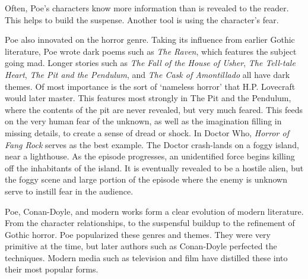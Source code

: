 \documentclass[12pt]{article}
\begin{document}
Often, Poe's characters know more information than is revealed to the reader.
This helps to build the suspense. Another tool is using the character's fear.

Poe also innovated on the horror genre. Taking its influence from earlier
Gothic literature, Poe wrote dark poems such as \emph{The Raven}, which
features the subject going mad. Longer stories such as \emph{The Fall of the
House of Usher}, \emph{The Tell-tale Heart}, \emph{The Pit and the Pendulum},
and \emph{The Cask of Amontillado} all have dark themes. Of most importance is
the sort of `nameless horror' that H.P.  Lovecraft would later master. This
features most strongly in The Pit and the Pendulum, where the contents of the
pit are never revealed, but very much feared. This feeds on the very human
fear of the unknown, as well as the imagination filling in missing details, to
create a sense of dread or shock. In Doctor Who, \emph{Horror of Fang Rock}
serves as the best example. The Doctor crash-lands on a foggy island, near a
lighthouse. As the episode progresses, an unidentified force begins killing
off the inhabitants of the island. It is eventually revealed to be a hostile
alien, but the foggy scene and large portion of the episode where the enemy is
unknown serve to instill fear in the audience.

Poe, Conan-Doyle, and modern works form a clear evolution of modern
literature. From the character relationships, to the suspensful buildup to the
refinement of Gothic horror. Poe popularized these genres and themes. They
were very primitive at the time, but later authors such as Conan-Doyle
perfected the techniques. Modern media such as television and film have
distilled these into their most popular forms.
\end{document}
